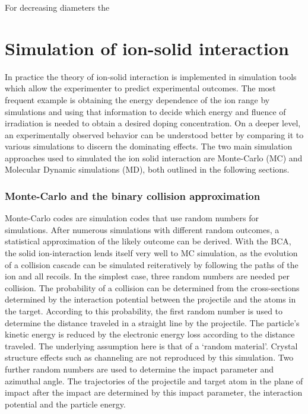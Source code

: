 For decreasing diameters the 

\section{Simulation of ion-solid interaction}

In practice the theory of ion-solid interaction is implemented in simulation tools which allow the experimenter to predict experimental outcomes. The most frequent example is obtaining the energy dependence of the ion range by simulations and using that information to decide which energy and fluence of irradiation is needed to obtain a desired doping concentration. On a deeper level, an experimentally observed behavior can be understood better by comparing it to various simulations to discern the dominating effects. The two main simulation approaches used to simulated the ion solid interaction are Monte-Carlo (MC) and Molecular Dynamic simulations (MD), both outlined in the following sections.


\subsubsection{Monte-Carlo and the binary collision approximation}

Monte-Carlo codes are simulation codes that use random numbers for simulations. After numerous simulations with different random outcomes, a statistical approximation of the likely outcome can be derived. With the BCA, the solid ion-interaction lends itself very well to MC simulation, as the evolution of a collision cascade can be simulated reiteratively by following the paths of the ion and all recoils. In the simplest case, three random numbers are needed per collision. The probability of a collision can be determined from the cross-sections determined by the interaction potential between the projectile and the atoms in the target. According to this probability, the first random number is used to determine the distance traveled in a straight line by the projectile. The particle's kinetic energy is reduced by the electronic energy loss according to the distance traveled. The underlying assumption here is that of a `random material'. Crystal structure effects such as channeling are not reproduced by this simulation. Two further random numbers are used to determine the impact parameter and azimuthal angle. The trajectories of the projectile and target atom in the plane of impact after the impact are determined by this impact parameter, the interaction potential and the particle energy. 

